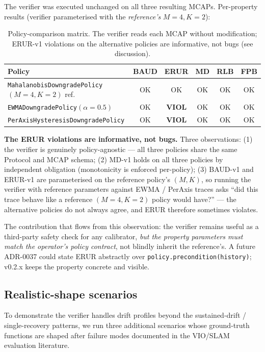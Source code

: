\documentclass[11pt,a4paper]{article}
\begin{document}
The verifier was executed unchanged on all three resulting MCAPs.
Per-property results (verifier parameterised with the
\emph{reference's} $M{=}4, K{=}2$):

\begin{table}[h]
\centering
\small
\begin{tabular}{lccccc}
\toprule
\textbf{Policy} & \textbf{BAUD} & \textbf{ERUR} & \textbf{MD} & \textbf{RLB} & \textbf{FPB} \\
\midrule
\texttt{MahalanobisDowngradePolicy}$(M{=}4, K{=}2)$ ref. & OK & OK & OK & OK & OK \\
\texttt{EWMADowngradePolicy}$(\alpha{=}0.5)$            & OK & \textbf{VIOL} & OK & OK & OK \\
\texttt{PerAxisHysteresisDowngradePolicy}              & OK & \textbf{VIOL} & OK & OK & OK \\
\bottomrule
\end{tabular}
\caption{Policy-comparison matrix. The verifier reads each MCAP
without modification; ERUR-v1 violations on the alternative
policies are informative, not bugs (see discussion).}
\label{tab:policy-comparison}
\end{table}

\textbf{The ERUR violations are informative, not bugs.} Three
observations: (1) the verifier is genuinely policy-agnostic ---
all three policies share the same Protocol and MCAP schema;
(2) MD-v1 holds on all three policies by independent obligation
(monotonicity is enforced per-policy); (3) BAUD-v1 and ERUR-v1
are parameterised on the reference policy's $(M, K)$, so running
the verifier with reference parameters against EWMA / PerAxis
traces asks ``did this trace behave like a reference $(M{=}4,
K{=}2)$ policy would have?'' --- the alternative policies do not
always agree, and ERUR therefore sometimes violates.

The contribution that flows from this observation: the verifier
remains useful as a third-party safety check for any calibrator,
\emph{but the property parameters must match the operator's policy
contract}, not blindly inherit the reference's. A future ADR-0037
could state ERUR abstractly over \texttt{policy.precondition(history)};
v0.2.x keeps the property concrete and visible.

\subsection{Realistic-shape scenarios}
\label{sec:realistic}

To demonstrate the verifier handles drift profiles beyond the
sustained-drift / single-recovery patterns, we run three additional
scenarios whose ground-truth functions are shaped after failure
modes documented in the VIO/SLAM evaluation literature.
\end{document}
